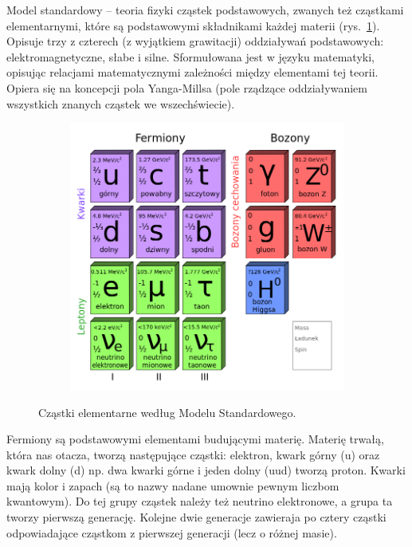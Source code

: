 Model standardowy – teoria fizyki cząstek podstawowych, zwanych też cząstkami elementarnymi, które są podstawowymi składnikami każdej materii (rys.~\ref{standard_model}). Opisuje trzy z czterech (z wyjątkiem grawitacji) oddziaływań podstawowych: elektromagnetyczne, słabe i silne. Sformułowana jest w języku matematyki, opisując relacjami matematycznymi zależności między elementami tej teorii. Opiera się na koncepcji pola Yanga-Millsa (pole rządzące oddziaływaniem wszystkich znanych cząstek we wszechświecie).

\begin{figure} [H]
	\centering
	\begin{subfigure}{.99\textwidth}
		\centering
		\includegraphics[width=0.7\linewidth]{generalIssues/Figures/standard_model.png}
	\end{subfigure}
	\caption{Cząstki elementarne według Modelu Standardowego.}
	\label{standard_model}
\end{figure}

Fermiony są podstawowymi elementami budującymi materię. Materię trwałą, która nas otacza, tworzą następujące cząstki: elektron, kwark górny (u) oraz kwark dolny (d) np.  dwa kwarki górne i jeden dolny (uud) tworzą proton. Kwarki mają kolor i zapach (są to nazwy nadane umownie pewnym liczbom kwantowym). Do tej grupy cząstek należy też neutrino elektronowe, a grupa ta tworzy pierwszą generację. Kolejne dwie generacje zawieraja po cztery cząstki odpowiadające cząstkom z pierwszej generacji (lecz o różnej masie).

